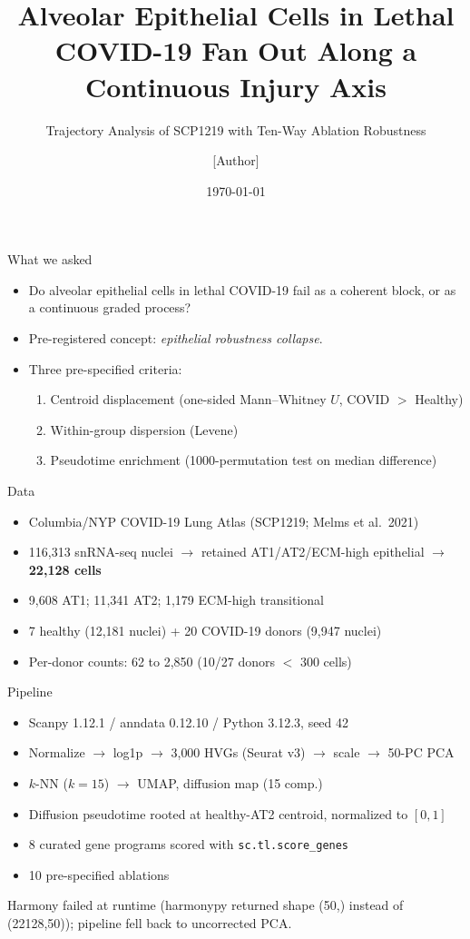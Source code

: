 \documentclass[aspectratio=169]{beamer}
\title{Alveolar Epithelial Cells in Lethal COVID-19 Fan Out Along a Continuous Injury Axis}
\subtitle{Trajectory Analysis of SCP1219 with Ten-Way Ablation Robustness}
\author{[Author]}
\institute{Class Project}
\date{\today}
\begin{document}
\maketitle

\begin{frame}{What we asked}
\begin{itemize}
  \item Do alveolar epithelial cells in lethal COVID-19 fail as a coherent block, or as a continuous graded process?
  \item Pre-registered concept: \emph{epithelial robustness collapse}.
  \item Three pre-specified criteria:
  \begin{enumerate}
    \item Centroid displacement (one-sided Mann--Whitney $U$, COVID $>$ Healthy)
    \item Within-group dispersion (Levene)
    \item Pseudotime enrichment (1000-permutation test on median difference)
  \end{enumerate}
\end{itemize}
\end{frame}

\begin{frame}{Data}
\begin{itemize}
  \item Columbia/NYP COVID-19 Lung Atlas (SCP1219; Melms et al.\ 2021)
  \item 116{,}313 snRNA-seq nuclei $\rightarrow$ retained AT1/AT2/ECM-high epithelial $\rightarrow$ \textbf{22{,}128 cells}
  \item 9{,}608 AT1; 11{,}341 AT2; 1{,}179 ECM-high transitional
  \item 7 healthy (12{,}181 nuclei) + 20 COVID-19 donors (9{,}947 nuclei)
  \item Per-donor counts: 62 to 2{,}850 (10/27 donors $<$ 300 cells)
\end{itemize}
\end{frame}

\begin{frame}{Pipeline}
\begin{itemize}
  \item Scanpy 1.12.1 / anndata 0.12.10 / Python 3.12.3, seed 42
  \item Normalize $\rightarrow$ log1p $\rightarrow$ 3{,}000 HVGs (Seurat v3) $\rightarrow$ scale $\rightarrow$ 50-PC PCA
  \item $k$-NN ($k{=}15$) $\rightarrow$ UMAP, diffusion map (15 comp.)
  \item Diffusion pseudotime rooted at healthy-AT2 centroid, normalized to $[0,1]$
  \item 8 curated gene programs scored with \texttt{sc.tl.score\_genes}
  \item 10 pre-specified ablations
\end{itemize}
\alert{Harmony failed at runtime} (harmonypy returned shape (50,) instead of (22128,50)); pipeline fell back to uncorrected PCA.
\end{frame}
\end{document}
